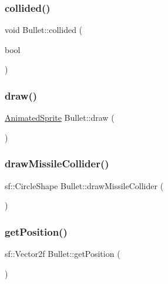 \subsubsection{\texorpdfstring{collided()}{collided()}}
{\footnotesize\ttfamily void Bullet\+::collided (\begin{DoxyParamCaption}\item[{bool}]{ }\end{DoxyParamCaption})}

\mbox{\label{class_bullet_abd80643d0485e32232ad46cc2087de40}} 
\subsubsection{\texorpdfstring{draw()}{draw()}}
{\footnotesize\ttfamily \hyperlink{class_animated_sprite}{Animated\+Sprite} Bullet\+::draw (\begin{DoxyParamCaption}{ }\end{DoxyParamCaption})}

\mbox{\label{class_bullet_ac8c9c18e09ff7ef97313aa0c805c9846}} 
\subsubsection{\texorpdfstring{draw\+Missile\+Collider()}{drawMissileCollider()}}
{\footnotesize\ttfamily sf\+::\+Circle\+Shape Bullet\+::draw\+Missile\+Collider (\begin{DoxyParamCaption}{ }\end{DoxyParamCaption})}

\mbox{\label{class_bullet_a64e4ce634f62ab31d338bd142c1987c9}} 
\subsubsection{\texorpdfstring{get\+Position()}{getPosition()}}
{\footnotesize\ttfamily sf\+::\+Vector2f Bullet\+::get\+Position (\begin{DoxyParamCaption}{ }\end{DoxyParamCaption})}

